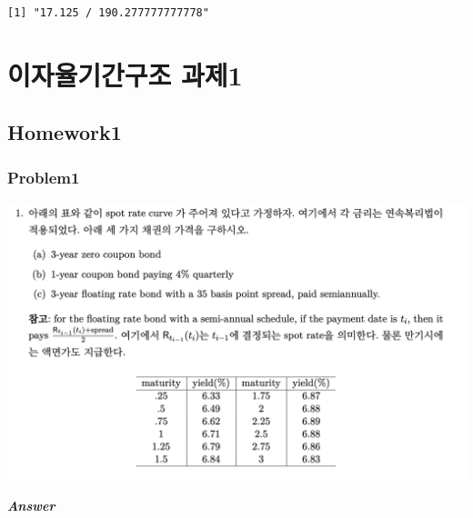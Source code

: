 \documentclass[
  a4paper,
  DIV=11,
  numbers=noendperiod]{scrreprt}
\begin{document}
\begin{verbatim}
[1] "17.125 / 190.277777777778"
\end{verbatim}

\chapter*{이자율기간구조
과제1}\label{uxc774uxc790uxc728uxae30uxac04uxad6cuxc870-uxacfcuxc81c1}


\section*{Homework1}\label{homework1}


\subsection*{Problem1}\label{problem1}

\includegraphics{images/이자율hw1_1.png}

\textbf{\emph{Answer}}
\end{document}
